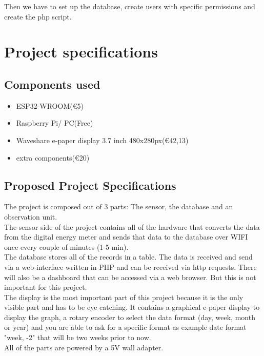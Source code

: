 \documentclass[a4paper,twoside, 12pt]{report}
\theoremstyle{break}
\begin{document}
Then we have to set up the database, create users with specific permissions and create the php script.

\chapter{Project specifications}
\section{Components used}
\begin{itemize}
  \item ESP32-WROOM\tabto{11cm}(€5)
  \item Raspberry Pi/ PC\tabto{11cm}(Free)
  \item Waveshare e-paper display 3.7 inch 480x280px\tabto{11cm}(€42,13)
  \item extra components\tabto{11cm}(€20)

\end{itemize}

\section{Proposed Project Specifications}
The project is composed out of 3 parts: The sensor, the database and an observation unit. \ \\
The sensor side of the project contains all of the hardware that converts the data from the digital energy meter and sends that data to the database over WIFI once every couple of minutes (1-5 min).
\ \\
The database stores all of the records in a table. The data is received and send via a web-interface written in PHP and can be received via http requests. There will also be a dashboard that can be accessed via a web browser. But this is not important for this project.
\ \\
The display is the most important part of this project because it is the only visible part and has to be eye catching. It contains a graphical e-paper display to display the graph, a rotary encoder to select the data format (day, week, month or year) and you are able to ask for a specific format as example date format "week, -2" that will be two weeks prior to now.
\ \\
All of the parts are powered by a 5V wall adapter.
\end{document}
